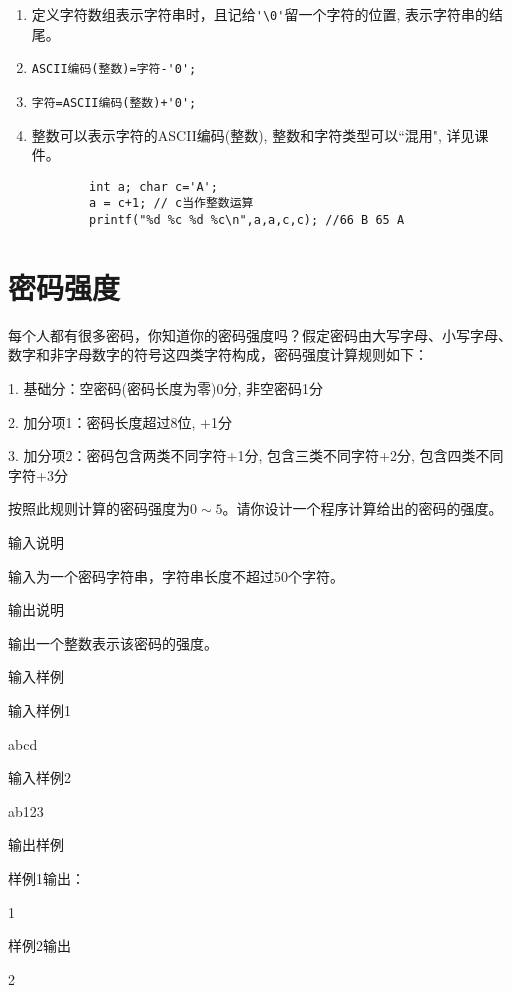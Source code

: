 \begin{note}[要点]
	\begin{enumerate}
		\item 定义字符数组表示字符串时，且记给\lstinline|'\0'|留一个字符的位置, 表示字符串的结尾。
		\item \lstinline|ASCII编码(整数)=字符-'0';|
		\item \lstinline|字符=ASCII编码(整数)+'0';|
		\item 整数可以表示字符的ASCII编码(整数), 整数和字符类型可以``混用", 详见课件。
		\begin{lstlisting}
		int a; char c='A';
		a = c+1; // c当作整数运算
		printf("%d %c %d %c\n",a,a,c,c); //66 B 65 A 
		\end{lstlisting}
	\end{enumerate}
\end{note}

\section{密码强度}
每个人都有很多密码，你知道你的密码强度吗？假定密码由大写字母、小写字母、数字和非字母数字的符号这四类字符构成，密码强度计算规则如下：

1.	基础分：空密码(密码长度为零)0分, 非空密码1分

2.	加分项1：密码长度超过8位, +1分

3.	加分项2：密码包含两类不同字符+1分, 包含三类不同字符+2分, 包含四类不同字符+3分

按照此规则计算的密码强度为$0\sim 5$。请你设计一个程序计算给出的密码的强度。

输入说明
	
输入为一个密码字符串，字符串长度不超过50个字符。

输出说明
	
输出一个整数表示该密码的强度。

输入样例
	
输入样例1

abcd

输入样例2

ab123

输出样例
	
样例1输出：

1

样例2输出

2

